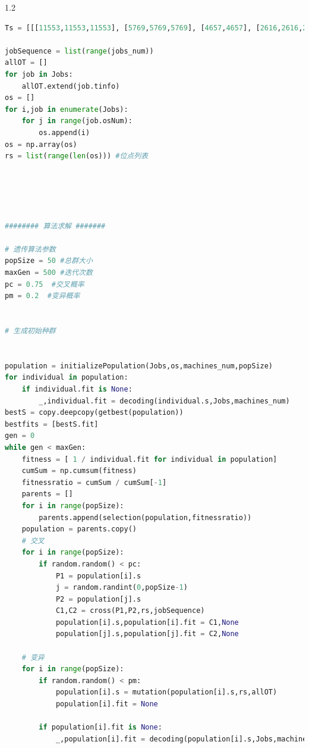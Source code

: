 \documentclass{whutmod}
\begin{document}
\begin{spacing}{1.2}
\begin{lstlisting}[language=python]
Ts = [[[11553,11553,11553], [5769,5769,5769], [4657,4657], [2616,2616,2616]], [[17380,17380], [19770,19770], [4905,4905,4905], [1]], [[8410,8410,8410,8410], [15855,15855,15855], [3902,3902,3902,3902], [1]], [[10370,10370,10370], [10000,10000,10000], [9386,9386,9386], [1]], [[11655,11655,11655,11655], [7043,7043,7043,7043], [14355,14355,14355], [23410,23410,23410]], [[6480,6480,6480,6480], [5735,5735,5735,5735], [10585,10585,10585], [4125,4125,4125,4125]], [[9405,9405,9405,9405], [11665,11665,11665], [18910,18910,18910], [5375,5375,5375]], [[4975,4975,4975,4975], [4975,4975,4975,4975], [7395,7395,7395], [2875,2875,2875]], [[11430,11430,11430,11430], [9155,9155,9155,9155], [1], [1]]]

jobSequence = list(range(jobs_num))
allOT = []
for job in Jobs:
    allOT.extend(job.tinfo)
os = []
for i,job in enumerate(Jobs):
    for j in range(job.osNum):
        os.append(i)
os = np.array(os)
rs = list(range(len(os))) #位点列表





######## 算法求解 #######

# 遗传算法参数
popSize = 50 #总群大小
maxGen = 500 #迭代次数
pc = 0.75  #交叉概率
pm = 0.2  #变异概率


# 生成初始种群


population = initializePopulation(Jobs,os,machines_num,popSize)
for individual in population:
    if individual.fit is None:
        _,individual.fit = decoding(individual.s,Jobs,machines_num)
bestS = copy.deepcopy(getbest(population))
bestfits = [bestS.fit]
gen = 0
while gen < maxGen:
    fitness = [ 1 / individual.fit for individual in population]
    cumSum = np.cumsum(fitness)
    fitnessratio = cumSum / cumSum[-1]
    parents = [] 
    for i in range(popSize):
        parents.append(selection(population,fitnessratio))
    population = parents.copy()
    # 交叉
    for i in range(popSize):
        if random.random() < pc:
            P1 = population[i].s
            j = random.randint(0,popSize-1)
            P2 = population[j].s
            C1,C2 = cross(P1,P2,rs,jobSequence)
            population[i].s,population[i].fit = C1,None
            population[j].s,population[j].fit = C2,None

    # 变异
    for i in range(popSize):
        if random.random() < pm:
            population[i].s = mutation(population[i].s,rs,allOT)
            population[i].fit = None
    
        if population[i].fit is None:
            _,population[i].fit = decoding(population[i].s,Jobs,machines_num)
    

\end{lstlisting}
\end{spacing}
\end{document}
